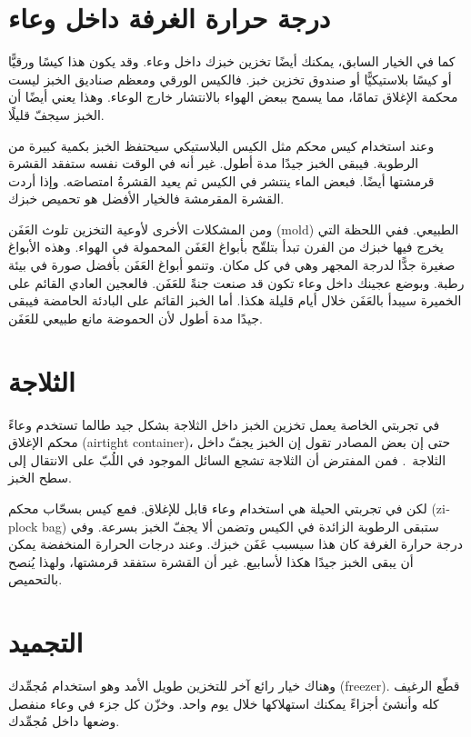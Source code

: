 \section{درجة حرارة الغرفة داخل وعاء}

كما في الخيار السابق، يمكنك أيضًا تخزين خبزك داخل وعاء. وقد يكون هذا كيسًا ورقيًّا أو كيسًا بلاستيكيًّا أو صندوق تخزين خبز. فالكيس الورقي ومعظم صناديق الخبز ليست محكمة الإغلاق تمامًا، مما يسمح ببعض الهواء بالانتشار خارج الوعاء. وهذا يعني أيضًا أن الخبز سيجفّ قليلًا.

وعند استخدام كيس محكم مثل الكيس البلاستيكي سيحتفظ الخبز بكمية كبيرة من الرطوبة. فيبقى الخبز جيدًا مدة أطول. غير أنه في الوقت نفسه ستفقد القشرة قرمشتها أيضًا. فبعض الماء ينتشر في الكيس ثم يعيد القشرةُ امتصاصَه. وإذا أردت القشرة المقرمشة فالخيار الأفضل هو تحميص خبزك.

ومن المشكلات الأخرى لأوعية التخزين تلوث العَفَن \textenglish{(mold)} الطبيعي. ففي اللحظة التي يخرج فيها خبزك من الفرن تبدأ بتلقّح بأبواغ العَفَن المحمولة في الهواء. وهذه الأبواغ صغيرة جدًّا لدرجة المجهر وهي في كل مكان. وتنمو أبواغ العَفَن بأفضل صورة في بيئة رطبة. وبوضع عجينك داخل وعاء تكون قد صنعت جنةً للعَفَن. فالعجين العادي القائم على الخميرة سيبدأ بالعَفَن خلال أيام قليلة هكذا. أما الخبز القائم على البادئة الحامضة فيبقى جيدًا مدة أطول لأن الحموضة مانع طبيعي للعَفَن.

\section{الثلاجة}

في تجربتي الخاصة يعمل تخزين الخبز داخل الثلاجة بشكل جيد طالما تستخدم وعاءً محكم الإغلاق \textenglish{(airtight container)}، حتى إن بعض المصادر تقول إن الخبز يجفّ داخل الثلاجة~\cite{storing+bread}. فمن المفترض أن الثلاجة تشجع السائل الموجود في اللُبّ على الانتقال إلى سطح الخبز.

لكن في تجربتي الحيلة هي استخدام وعاء قابل للإغلاق. فمع كيس بسحّاب محكم \textenglish{(ziplock bag)} ستبقى الرطوبة الزائدة في الكيس وتضمن ألا يجفّ الخبز بسرعة. وفي درجة حرارة الغرفة كان هذا سيسبب عَفَن خبزك. وعند درجات الحرارة المنخفضة يمكن أن يبقى الخبز جيدًا هكذا لأسابيع. غير أن القشرة ستفقد قرمشتها، ولهذا يُنصح بالتحميص.

\section{التجميد}

وهناك خيار رائع آخر للتخزين طويل الأمد وهو استخدام مُجمِّدك \textenglish{(freezer)}. قطّع الرغيف كله وأنشئ أجزاءً يمكنك استهلاكها خلال يوم واحد. وخزّن كل جزء في وعاء منفصل وضعها داخل مُجمِّدك.

